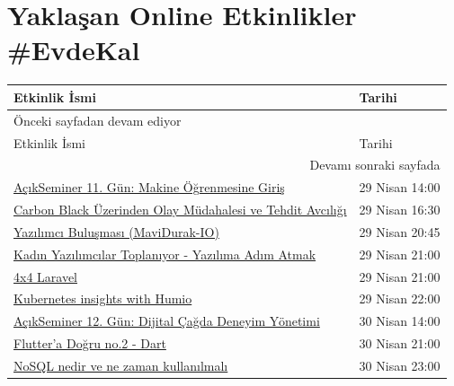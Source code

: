 \documentclass[11pt]{article}
\begin{document}
\section{Yaklaşan Online Etkinlikler \#EvdeKal}
\label{sec:org9ae10b2}
\begin{longtable}{|p{9.5cm}|l|}
\hline
Etkinlik İsmi & Tarihi\\
\hline
\endfirsthead
\multicolumn{2}{l}{Önceki sayfadan devam ediyor} \\
\hline

Etkinlik İsmi & Tarihi \\

\hline
\endhead
\hline\multicolumn{2}{r}{Devamı sonraki sayfada} \\
\endfoot
\endlastfoot
\hline
\href{https://kommunity.com/tracikkaynak/events/acik-seminer-11-gun-ml-algorithms-use-cases-watson-studio-workshops-hands-on-8936cb51}{AçıkSeminer 11. Gün: Makine Öğrenmesine Giriş} & 29 Nisan 14:00\\
\href{https://kommunity.com/akademi/events/carbon-black-uzerinden-olay-mudahalesi-ve-tehdit-avciligi-c4276138}{Carbon Black Üzerinden Olay Müdahalesi ve Tehdit Avcılığı} & 29 Nisan 16:30\\
\href{https://kommunity.com/mavidurakio/events/s1e38-yazilimci-bulusmasi-3c624265}{Yazılımcı Buluşması (MaviDurak-IO)} & 29 Nisan 20:45\\
\href{https://kommunity.com/kadin-yazilim-tasarim/events/soylesi-kadin-yazilimcilar-toplaniyor-yazilima-adim-atmak-canli-yayin-a2709f1b}{Kadın Yazılımcılar Toplanıyor - Yazılıma Adım Atmak} & 29 Nisan 21:00\\
\href{https://kommunity.com/istanbulphp/events/4x4-laravel-a5e89ab9}{4x4 Laravel} & 29 Nisan 21:00\\
\href{https://kommunity.com/devops-turkiye/events/kubernetes-insights-with-humio-3f940956}{Kubernetes insights with Humio} & 29 Nisan 22:00\\
\href{https://kommunity.com/tracikkaynak/events/acik-seminer-12-gun-dijital-cagda-deneyim-yonetimi-50cbfc05}{AçıkSeminer 12. Gün: Dijital Çağda Deneyim Yönetimi} & 30 Nisan 14:00\\
\href{https://kommunity.com/mobilerdev/events/fluttera-dogru-2-dart-fecaa463}{Flutter'a Doğru no.2 - Dart} & 30 Nisan 21:00\\
\href{https://kommunity.com/cloud-and-serverless-turkey/events/ramazan-ozel-2-nosql-nedir-ve-ne-zaman-kullanilmali-0e8533fb}{NoSQL nedir ve ne zaman kullanılmalı} & 30 Nisan 23:00\\

\end{longtable}
\end{document}
